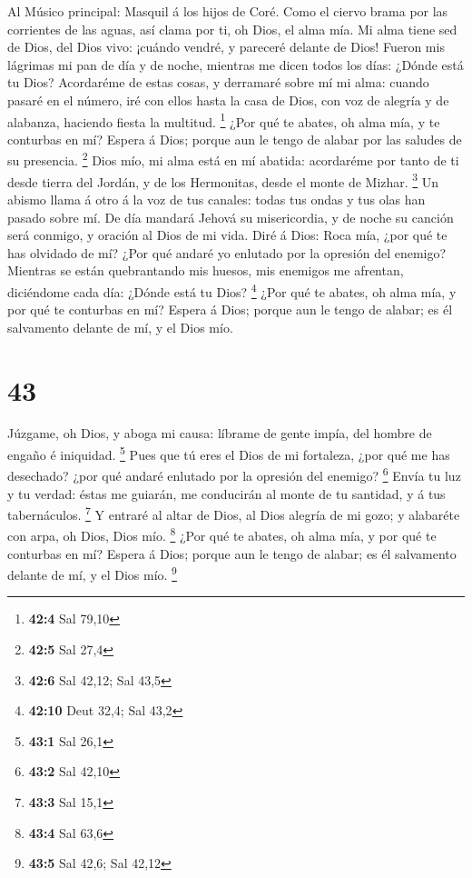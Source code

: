  Al Músico principal: Masquil á los hijos de Coré. Como el
ciervo brama por las corrientes de las aguas, así clama por ti, oh Dios,
el alma mía.  Mi alma tiene sed de Dios, del Dios vivo:
¡cuándo vendré, y pareceré delante de Dios!  Fueron mis
lágrimas mi pan de día y de noche, mientras me dicen todos los días:
¿Dónde está tu Dios?  Acordaréme de estas cosas, y derramaré
sobre mí mi alma: cuando pasaré en el número, iré con ellos hasta la
casa de Dios, con voz de alegría y de alabanza, haciendo fiesta la
multitud. \footnote{\textbf{42:4} Sal 79,10}  ¿Por qué te
abates, oh alma mía, y te conturbas en mí? Espera á Dios; porque aun le
tengo de alabar por las saludes de su presencia. \footnote{\textbf{42:5}
  Sal 27,4}  Dios mío, mi alma está en mí abatida:
acordaréme por tanto de ti desde tierra del Jordán, y de los Hermonitas,
desde el monte de Mizhar. \footnote{\textbf{42:6} Sal 42,12; Sal 43,5}
 Un abismo llama á otro á la voz de tus canales: todas tus
ondas y tus olas han pasado sobre mí.  De día mandará Jehová
su misericordia, y de noche su canción será conmigo, y oración al Dios
de mi vida.  Diré á Dios: Roca mía, ¿por qué te has olvidado
de mí? ¿Por qué andaré yo enlutado por la opresión del enemigo?
 Mientras se están quebrantando mis huesos, mis enemigos me
afrentan, diciéndome cada día: ¿Dónde está tu Dios? \footnote{\textbf{42:10}
  Deut 32,4; Sal 43,2}  ¿Por qué te abates, oh alma mía, y
por qué te conturbas en mí? Espera á Dios; porque aun le tengo de
alabar; es él salvamento delante de mí, y el Dios mío.

\hypertarget{section-42}{%
\section{43}\label{section-42}}

 Júzgame, oh Dios, y aboga mi causa: líbrame de gente impía,
del hombre de engaño é iniquidad. \footnote{\textbf{43:1} Sal 26,1}
 Pues que tú eres el Dios de mi fortaleza, ¿por qué me has
desechado? ¿por qué andaré enlutado por la opresión del enemigo?
\footnote{\textbf{43:2} Sal 42,10}  Envía tu luz y tu
verdad: éstas me guiarán, me conducirán al monte de tu santidad, y á tus
tabernáculos. \footnote{\textbf{43:3} Sal 15,1}  Y entraré
al altar de Dios, al Dios alegría de mi gozo; y alabaréte con arpa, oh
Dios, Dios mío. \footnote{\textbf{43:4} Sal 63,6}  ¿Por qué
te abates, oh alma mía, y por qué te conturbas en mí? Espera á Dios;
porque aun le tengo de alabar; es él salvamento delante de mí, y el Dios
mío. \footnote{\textbf{43:5} Sal 42,6; Sal 42,12}


